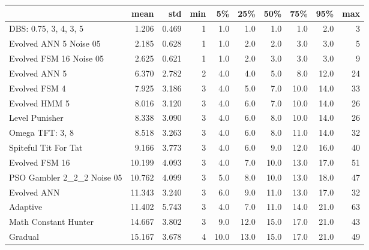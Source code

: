 \begin{tabular}{lrrrrrrrrr}
\toprule
{} &    mean &    std &  min &    5\% &   25\% &   50\% &   75\% &   95\% &  max \\
\midrule
DBS: 0.75, 3, 4, 3, 5      &   1.206 &  0.469 &    1 &   1.0 &   1.0 &   1.0 &   1.0 &   2.0 &    3 \\
Evolved ANN 5 Noise 05     &   2.185 &  0.628 &    1 &   1.0 &   2.0 &   2.0 &   3.0 &   3.0 &    5 \\
Evolved FSM 16 Noise 05    &   2.625 &  0.621 &    1 &   1.0 &   2.0 &   3.0 &   3.0 &   3.0 &    9 \\
Evolved ANN 5              &   6.370 &  2.782 &    2 &   4.0 &   4.0 &   5.0 &   8.0 &  12.0 &   24 \\
Evolved FSM 4              &   7.925 &  3.186 &    3 &   4.0 &   5.0 &   7.0 &  10.0 &  14.0 &   33 \\
Evolved HMM 5              &   8.016 &  3.120 &    3 &   4.0 &   6.0 &   7.0 &  10.0 &  14.0 &   26 \\
Level Punisher             &   8.338 &  3.090 &    3 &   4.0 &   6.0 &   8.0 &  10.0 &  14.0 &   26 \\
Omega TFT: 3, 8            &   8.518 &  3.263 &    3 &   4.0 &   6.0 &   8.0 &  11.0 &  14.0 &   32 \\
Spiteful Tit For Tat       &   9.166 &  3.773 &    3 &   4.0 &   6.0 &   9.0 &  12.0 &  16.0 &   40 \\
Evolved FSM 16             &  10.199 &  4.093 &    3 &   4.0 &   7.0 &  10.0 &  13.0 &  17.0 &   51 \\
PSO Gambler 2\_2\_2 Noise 05 &  10.762 &  4.099 &    3 &   5.0 &   8.0 &  10.0 &  13.0 &  18.0 &   47 \\
Evolved ANN                &  11.343 &  3.240 &    3 &   6.0 &   9.0 &  11.0 &  13.0 &  17.0 &   32 \\
Adaptive                   &  11.402 &  5.743 &    3 &   4.0 &   7.0 &  11.0 &  14.0 &  21.0 &   63 \\
Math Constant Hunter       &  14.667 &  3.802 &    3 &   9.0 &  12.0 &  15.0 &  17.0 &  21.0 &   43 \\
Gradual                    &  15.167 &  3.678 &    4 &  10.0 &  13.0 &  15.0 &  17.0 &  21.0 &   49 \\
\bottomrule
\end{tabular}

